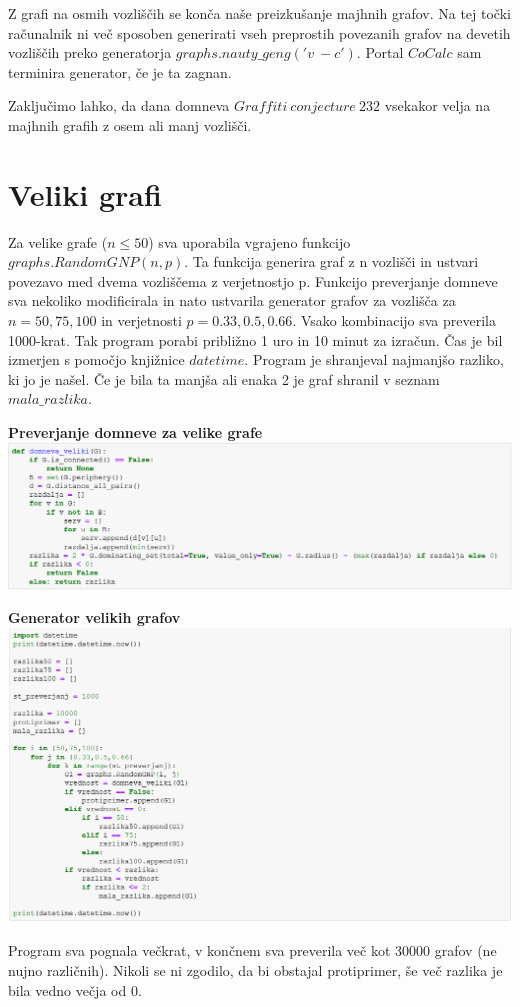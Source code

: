 \documentclass[10pt, a4paper]{article}
\begin{document}
Z grafi na osmih vozliščih se konča naše preizkušanje majhnih grafov. Na tej točki računalnik ni več sposoben generirati vseh preprostih povezanih grafov na devetih vozliščih preko generatorja  $graphs.nauty\_geng('v\ -c')$. Portal $CoCalc$ sam terminira generator, če je ta zagnan.

Zaključimo lahko, da dana domneva $Graffiti\ conjecture\ 232$ vsekakor velja na majhnih grafih z osem ali manj vozlišči.

\section{Veliki grafi}
Za velike grafe ($n\leq50$) sva uporabila vgrajeno funkcijo $graphs.RandomGNP(n,p)$. Ta funkcija generira graf z n vozlišči in ustvari povezavo med dvema vozliščema z verjetnostjo p. Funkcijo preverjanje domneve sva nekoliko modificirala in nato ustvarila generator grafov za vozlišča za $n=50,75,100$ in verjetnosti $p=0.33,0.5,0.66$. Vsako kombinacijo sva preverila 1000-krat. Tak program porabi približno 1 uro in 10 minut za izračun. Čas je bil izmerjen s pomočjo knjižnice $datetime$. Program je shranjeval najmanjšo razliko, ki jo je našel. Če je bila ta manjša ali enaka 2 je graf shranil v seznam $mala\_razlika$.

\begin{center}
\textbf{Preverjanje domneve za velike grafe}
\includegraphics[width=16cm]{domneva_veliki}
\end{center}

\pagebreak

\begin{center}
\textbf{Generator velikih grafov}
\includegraphics[width=16cm]{veliki_grafi}
\end{center}

Program sva pognala večkrat, v končnem sva preverila več kot 30000 grafov (ne nujno različnih). Nikoli se ni zgodilo, da bi obstajal protiprimer, še več razlika je bila vedno večja od 0.
\end{document}
